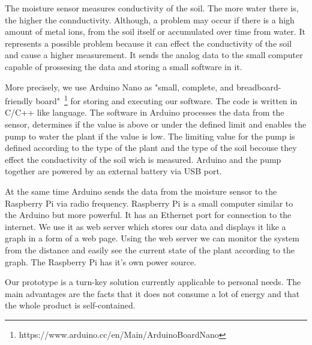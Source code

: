 \documentclass[conference]{IEEEtran}
\begin{document}

The moisture sensor measures conductivity of the soil.
The more water there is, the higher the connductivity.
Although, a problem may occur if there is a high amount of metal ions, from the soil itself or accumulated over time from water.
It represents a possible problem because it can effect the conductivity of the soil and cause a higher measurement.
It sends the analog data to the small computer capable of prossesing the data and storing a small software in it.


More precisely, we use Arduino Nano as "small, complete, and breadboard-friendly board"~\footnote{https://www.arduino.cc/en/Main/ArduinoBoardNano} for storing and executing our software.
The code is written in C/C++ like language.
The software in Arduino processes the data from the sensor, determines if the value is above or under the defined limit and enables the pump to water the plant if the value is low.
The limiting value for the pump is defined according to the type of the plant and the type of the soil becouse they effect the conductivity of the soil wich is measured.
Arduino and the pump together are powered by an external battery via USB port.


At the same time Arduino sends the data from the moisture sensor to the Raspberry Pi via radio frequency.
Raspberry Pi is a small computer similar to the Arduino but more powerful.
It has an Ethernet port for connection to the internet.
We use it as web server which stores our data and displays it like a graph in a form of a web page.
Using the web server we can monitor the system from the distance and easily see the current state of the plant according to the graph.
The Raspberry Pi has it's own power source.


Our prototype is a turn-key solution currently applicable to personal needs.
The main advantages are the facts that it does not consume a lot of energy and that the whole product is self-contained.
\end{document}
